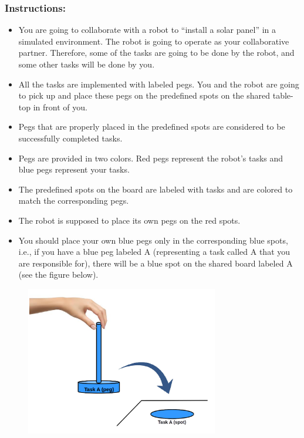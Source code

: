 \documentclass[12pt]{report}
\begin{document}
\begin{appendices}
\subsubsection{Instructions:}
\begin{itemize}
  \item You are going to collaborate with a robot to “install a solar panel” in
  a simulated environment. The robot is going to operate as your collaborative
  partner. Therefore, some of the tasks are going to be done by the robot, and
  some other tasks will be done by you.
  \item All the tasks are implemented with labeled pegs. You and the robot are
  going to pick up and place these pegs on the predefined spots on the shared
  table-top in front of you.
  \item Pegs that are properly placed in the predefined spots are considered to
  be successfully completed tasks.
  \item Pegs are provided in two colors. Red pegs represent the robot's tasks
  and blue pegs represent your tasks.
  \item The predefined spots on the board are labeled with  tasks and are
  colored to match the corresponding pegs.
  \item The robot is supposed to place its own pegs on the red spots.
  \item You should place your own blue pegs only in the corresponding blue
  spots, i.e., if you have a blue peg labeled A (representing a task called A
  that you are responsible for), there will be a blue spot on the shared board
  labeled A (see the figure below).
\end{itemize}

\begin{figure}[tbh]
 \centering
 \includegraphics[width=0.75\textwidth]{figure/TaskExecution.png}
\end{figure}


\end{appendices}
\end{document}
